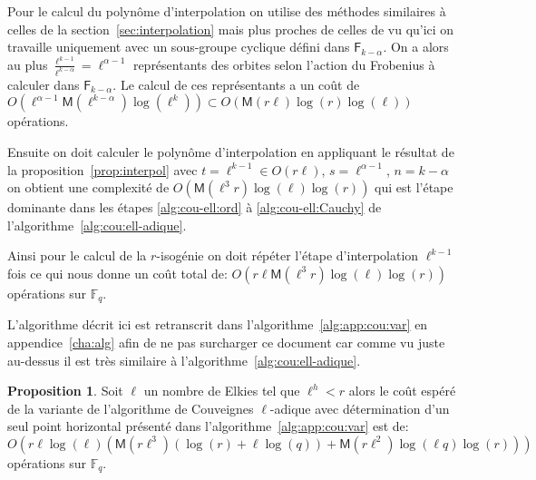 \documentclass[10pt,a4paper]{book}
\theoremstyle{plain}
\theoremstyle{definition}
\theoremstyle{definition}
\theoremstyle{definition}
\newtheorem{prop}[thm]{Proposition}
\theoremstyle{definition}
\theoremstyle{remark}
\theoremstyle{remark}
\theoremstyle{definition}
\begin{document}
Pour le calcul du polynôme d'interpolation on utilise des méthodes 
similaires à celles de la section~\ref{sec:interpolation} mais plus proches de 
celles de \cite[§5]{DeFeo11} vu qu'ici on travaille uniquement avec un sous-groupe 
cyclique défini dans $\mathsf{F}_{k-\alpha}$. 
On a alors au plus $\frac{\ell^{k-1}}{\ell^{k-\alpha}}=\ell^{\alpha-1}$ représentants 
des orbites selon l'action du Frobenius à calculer dans $\mathsf{F}_{k-\alpha}$.
Le calcul de ces représentants a un coût de 
$O(\ell^{\alpha-1}\mathsf{M}(\ell^{k-\alpha})\log(\ell^k)) \subset O(\mathsf{M}(r\ell)\log(r)\log(\ell))$ opérations.

Ensuite on doit calculer le polynôme d'interpolation en appliquant le résultat
 de la proposition~\ref{prop:interpol} avec $t=\ell^{k-1} \in O(r \ell)$, $s=\ell^{\alpha-1}$, 
 $n=k-\alpha$ on obtient une complexité de 
 $O(\mathsf{M}(\ell^3r)\log(\ell)\log(r))$ qui est l'étape dominante dans les
 étapes \ref{alg:cou-ell:ord} à \ref{alg:cou-ell:Cauchy} de 
 l'algorithme~\ref{alg:cou:ell-adique}.

Ainsi pour le calcul de la $r$-isogénie on doit répéter l'étape d'interpolation 
$\ell^{k-1}$ fois ce qui nous donne un coût total de: 
$O(r \ell \mathsf{M}(\ell^3r)\log(\ell)\log(r))$ opérations sur $\mathbb{F}_q$.

L'algorithme décrit ici est retranscrit dans l'algorithme~\ref{alg:app:cou:var}
en appendice~\ref{cha:alg} afin de ne pas surcharger ce document car comme vu 
juste au-dessus il est très similaire à l'algorithme~\ref{alg:cou:ell-adique}.

\begin{prop}
Soit $\ell$ un nombre de Elkies tel que $\ell^h<r$ alors le coût espéré de la 
variante de l'algorithme de Couveignes $\ell$-adique avec détermination d'un 
seul point horizontal présenté dans l'algorithme~\ref{alg:app:cou:var} 
est de: 
\[
O(r \ell \log(\ell) ( \mathsf{M}(r \ell^3) (\log(r) + \ell \log(q)) + \mathsf{M}(r \ell^2) \log(\ell q) \log(r) ) )
\]
opérations sur $\mathbb{F}_q$.
\end{prop}
\end{document}

